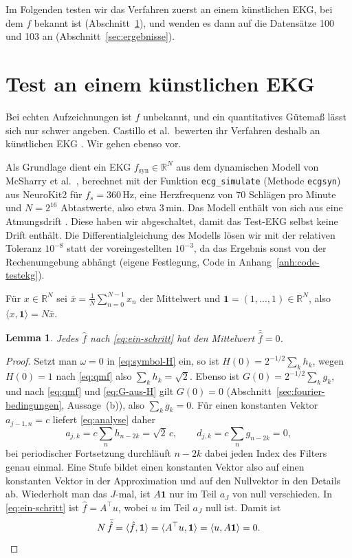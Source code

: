 \documentclass[a4paper,11pt,bibliography=totoc,listof=totoc,headinclude=true,cleardoublepage=empty,oneside]{scrbook}
\theoremstyle{plain}
\newtheorem{Lemma}[Satz]{Lemma}
\theoremstyle{definition}
\newcommand{\R}{\mathbb{R}}
\newcommand{\scal}[2]{\langle #1, #2 \rangle}
\begin{document}
Im Folgenden testen wir das Verfahren zuerst an einem künstlichen EKG, bei
dem $f$ bekannt ist (Abschnitt~\ref{sec:test}), und wenden es dann auf die
Datensätze 100 und 103 an (Abschnitt~\ref{sec:ergebnisse}).

\section{Test an einem künstlichen EKG}
\label{sec:test}

Bei echten Aufzeichnungen ist $f$ unbekannt, und ein quantitatives Gütema\ss{}
lässt sich nur schwer angeben. Castillo et al.\ bewerten ihr Verfahren deshalb
an künstlichen EKG \cite[Abschn.~4]{castillo}. %
Wir gehen ebenso vor.

Als Grundlage dient ein EKG $f_{\mathrm{syn}}\in\R^N$ aus dem dynamischen
Modell von McSharry et al.\ \cite{mcsharry}, berechnet mit der Funktion
\texttt{ecg\_simulate} (Methode \texttt{ecgsyn}) aus NeuroKit2
\cite{neurokit2} für $f_s = 360$\,Hz, eine Herzfrequenz von $70$ Schlägen
pro Minute und $N = 2^{16}$ Abtastwerte, also etwa $3$\,min. Das Modell
enthält von sich aus eine Atmungsdrift \cite[Abschn.~IV, Gl.~(2)]{mcsharry}. %
Diese haben wir abgeschaltet, damit das Test-EKG selbst keine Drift enthält.
Die Differentialgleichung des Modells lösen wir mit der relativen Toleranz
$10^{-8}$ statt der voreingestellten $10^{-3}$, da das Ergebnis sonst von der
Rechenumgebung abhängt (eigene Festlegung, Code in
Anhang~\ref{anh:code-testekg}).

Für $x\in\R^N$ sei $\bar x = \frac1N\sum_{n=0}^{N-1} x_n$ der Mittelwert und
$\mathbf 1 = (1,\dots,1)\in\R^N$, also $\scal{x}{\mathbf 1} = N\bar x$.

\begin{Lemma}
\label{lem:mittelwert-null}
Jedes $\hat f$ nach \eqref{eq:ein-schritt} hat den Mittelwert $\bar{\hat f} = 0$.
\end{Lemma}

\begin{proof}
Setzt man $\omega = 0$ in \eqref{eq:symbol-H} ein, so ist
$H(0) = 2^{-1/2}\sum_k h_k$, wegen $H(0) = 1$ nach \eqref{eq:qmf} also
$\sum_k h_k = \sqrt2$. Ebenso ist $G(0) = 2^{-1/2}\sum_k g_k$, und nach
\eqref{eq:qmf} und \eqref{eq:G-aus-H} gilt $G(0) = 0$
(Abschnitt~\ref{sec:fourier-bedingungen}, Aussage~(b)), also
$\sum_k g_k = 0$. Für einen konstanten Vektor $a_{j-1,n} = c$ liefert
\eqref{eq:analyse} daher
\[
  a_{j,k} = c\sum_n h_{n-2k} = \sqrt2\,c, \qquad
  d_{j,k} = c\sum_n g_{n-2k} = 0 ,
\]
bei periodischer Fortsetzung durchläuft $n-2k$ dabei jeden Index des Filters
genau einmal. Eine Stufe bildet einen konstanten Vektor also auf einen
konstanten Vektor in der Approximation und auf den Nullvektor in den Details
ab. Wiederholt man das $J$-mal, ist $A\mathbf 1$ nur im Teil $a_J$ von null
verschieden. In \eqref{eq:ein-schritt} ist $\hat f = A^\top u$, wobei $u$ im
Teil $a_J$ null ist. Damit ist
\[
  N\,\bar{\hat f} = \scal{\hat f}{\mathbf 1} = \scal{A^\top u}{\mathbf 1}
  = \scal{u}{A\mathbf 1} = 0 . \qedhere
\]
\end{proof}
\end{document}
